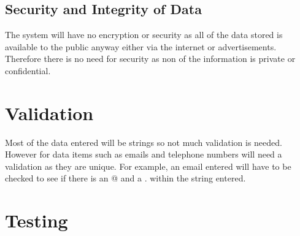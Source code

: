 \subsection{Security and Integrity of Data}
The system will have no encryption or security as all of the data stored is available to the public anyway either via the internet or advertisements. Therefore there is no need for security as non of the information is private or confidential.

\section{Validation}
Most of the data entered will be strings so not much validation is needed. However for data items such as emails and telephone numbers will need a validation as they are unique. For example, an email entered will have to be checked to see if there is an @ and a . within the string entered.

\section{Testing}

